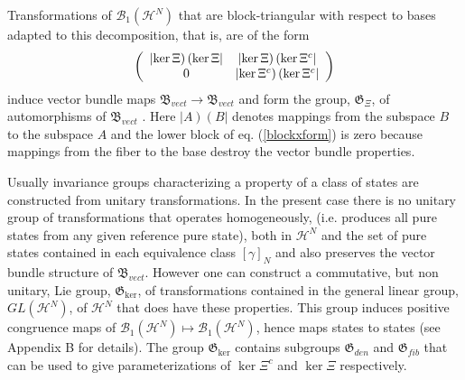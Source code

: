 \documentclass[aps,preprint]{revtex4}%
\begin{document}
Transformations of $\mathcal{B}_{1}\left(  \mathcal{H}^{N}\right)  $ that are
block-triangular with respect to bases adapted to this decomposition, that is,
are of the form
\begin{equation}
\left(
\begin{array}
[c]{cc}%
\left|  \ker\Xi\right)  \left(  \ker\Xi\right|  & \left|  \ker\Xi\right)
\left(  \ker\Xi^{c}\right| \\
0 & \left|  \ker\Xi^{c}\right)  \left(  \ker\Xi^{c}\right|
\end{array}
\right)  \label{blockxform}%
\end{equation}
induce vector bundle maps $\mathfrak{B}_{vect}\rightarrow\mathfrak{B}_{vect}$
and form the group, $\mathfrak{G}_{\Xi}$, of automorphisms of $\mathfrak{B}%
_{vect}$ \cite{Bruhat}. Here $\left|  A\right)  \left(  B\right|  $ denotes
mappings from the subspace $B$ to the subspace $A$ and the lower block of eq.
(\ref{blockxform}) is zero because mappings from the fiber to the base destroy
the vector bundle properties.

Usually invariance groups characterizing a property of a class of states are
constructed from unitary transformations. In the present case there is no
unitary group of transformations that operates homogeneously, (i.e. produces
all pure states from any given reference pure state), both in $\mathcal{H}%
^{N}$ and the set of pure states contained in each equivalence class $\left[
\gamma\right]  _{N}$ and also preserves the vector bundle structure of
$\mathfrak{B}_{vect}$. However one can construct a commutative, but non
unitary, Lie group, $\mathfrak{G}_{\ker}$, of transformations contained in the
general linear group, $GL\left(  \mathcal{H}^{N}\right)  $, of $\mathcal{H}%
^{N}$ that does have these properties. This group induces positive congruence
maps of $\mathcal{B}_{1}\left(  \mathcal{H}^{N}\right)  \mapsto\mathcal{B}%
_{1}\left(  \mathcal{H}^{N}\right)  $, hence maps states to states (see
Appendix B for details). The group $\mathfrak{G}_{\ker}$ contains subgroups
$\mathfrak{G}_{den}$ and $\mathfrak{G}_{fib}$ that can be used to give
parameterizations of $\ker\Xi^{c}$ and $\ker\Xi$ respectively.
\end{document}
